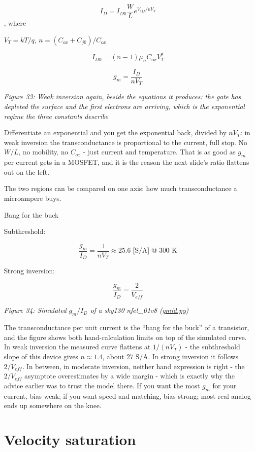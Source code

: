 \[ I_{D} = I_{D0} \frac{W}{L} e^{V_{eff} / n V_T} \], where

\(V_T = kT/q\), \(n = (C_{ox} + C_{j0})/C_{ox}\)

\[ I_{D0} = (n - 1) \mu_n C_{ox} V_T^2 \]

\[ g_m = \frac{I_D}{nV_T} \]


{
\centering
{}
}

\emph{Figure 33: Weak inversion again, beside the equations it produces:
the gate has depleted the surface and the first electrons are arriving,
which is the exponential regime the three constants describe}

Differentiate an exponential and you get the exponential back, divided
by \(nV_T\): in weak inversion the transconductance is proportional to
the current, full stop. No \(W/L\), no mobility, no \(C_{ox}\) - just
current and temperature. That is as good as \(g_m\) per current gets in
a MOSFET, and it is the reason the next slide's ratio flattens out on
the left.

The two regions can be compared on one axis: how much transconductance a
microampere buys.

Bang for the buck

Subthreshold:

\[ \frac{g_m}{I_D} = \frac{1}{nV_T} \approx 25.6 \text{ [S/A] @ 300 K} \]

Strong inversion:

\[ \frac{g_m}{I_D} = \frac{2}{V_{eff}}\]


{
\centering
{}
}

\emph{Figure 34: Simulated \(g_m/I_D\) of a sky130 nfet\_01v8
(\href{https://github.com/wulffern/aic2026/blob/main/ex/gmid.py}{gmid.py})}

The transconductance per unit current is the ``bang for the buck'' of a
transistor, and the figure shows both hand-calculation limits on top of
the simulated curve. In weak inversion the measured curve flattens at
\(1/(nV_T)\) - the subthreshold slope of this device gives
\(n \approx 1.4\), about 27 S/A. In strong inversion it follows
\(2/V_{eff}\). In between, in moderate inversion, neither hand
expression is right - the \(2/V_{eff}\) asymptote overestimates by a
wide margin - which is exactly why the advice earlier was to trust the
model there. If you want the most \(g_m\) for your current, bias weak;
if you want speed and matching, bias strong; most real analog ends up
somewhere on the knee.

\section{Velocity saturation}\label{velocity-saturation}

